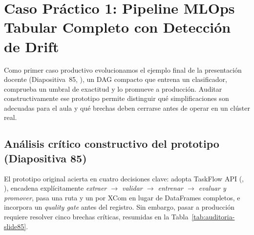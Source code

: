 \section[Caso Práctico 1: MLOps Tabular con Drift]{Caso Práctico 1: Pipeline MLOps Tabular Completo con Detección de Drift}\label{sec:caso-mlops-tabular}

Como primer caso productivo evolucionamos el ejemplo final de la presentación docente (Diapositiva~85, ), un DAG compacto que entrena un clasificador, comprueba un umbral de exactitud y lo promueve a producción. Auditar constructivamente ese prototipo permite distinguir qué simplificaciones son adecuadas para el aula y qué brechas deben cerrarse antes de operar en un clúster real.

\subsection{Análisis crítico constructivo del prototipo  (Diapositiva 85)}

El prototipo original acierta en cuatro decisiones clave: adopta TaskFlow API (, ), encadena explícitamente \textit{extraer $\rightarrow$ validar $\rightarrow$ entrenar $\rightarrow$ evaluar y promover}, pasa una ruta y un  por XCom en lugar de DataFrames completos, e incorpora un \textit{quality gate} antes del registro. Sin embargo, pasar a producción requiere resolver cinco brechas críticas, resumidas en la Tabla~\ref{tab:auditoria-slide85}.

